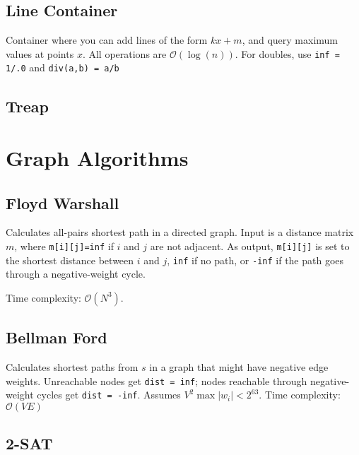 \documentclass{article}
\begin{document}
\subsection*{Line Container}
Container where you can add lines of the form $kx + m$, and query maximum values at points $x$.
All operations are $\mathcal{O}(\log(n))$. For doubles, use \lstinline{inf = 1/.0} and \lstinline{div(a,b) = a/b}


\subsection*{Treap}


\section*{Graph Algorithms}

\subsection*{Floyd Warshall}

Calculates all-pairs shortest path in a directed graph.
Input is a distance matrix $m$, where \lstinline{m[i][j]=inf} if $i$ and $j$ are not adjacent.
As output, \lstinline{m[i][j]} is set to the shortest distance between $i$ and $j$,
\lstinline{inf} if no path, or \lstinline{-inf} if the path goes through a negative-weight cycle.

Time complexity: $\mathcal{O}(N^3)$.




\subsection*{Bellman Ford}

Calculates shortest paths from $s$ in a graph that might have negative edge weights.
Unreachable nodes get \lstinline{dist = inf}; nodes reachable through negative-weight cycles get \lstinline{dist = -inf}.
Assumes $V^2 \max |w_i| < 2^{63}$. Time complexity: $\mathcal{O}(VE)$



\pagebreak

\subsection*{2-SAT}
\end{document}
